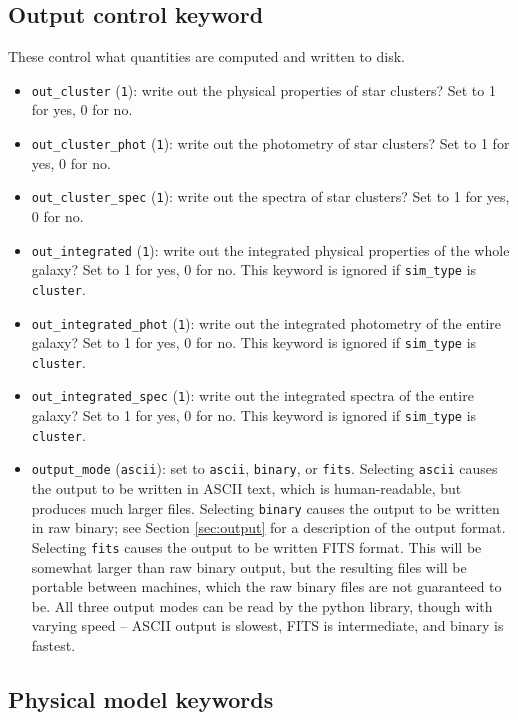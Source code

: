 \documentclass[12pt]{article}
\begin{document}
\subsection{Output control keyword}

These control what quantities are computed and written to disk.
\begin{itemize}
\item \verb=out_cluster= (\verb=1=): write out the physical properties of star clusters? Set to 1 for yes, 0 for no.
\item \verb=out_cluster_phot= (\verb=1=): write out the photometry of star clusters? Set to 1 for yes, 0 for no.
\item \verb=out_cluster_spec= (\verb=1=): write out the spectra of star clusters? Set to 1 for yes, 0 for no.
\item \verb=out_integrated= (\verb=1=): write out the integrated physical properties of the whole galaxy? Set to 1 for yes, 0 for no. This keyword is ignored if \verb=sim_type= is \verb=cluster=.
\item \verb=out_integrated_phot= (\verb=1=): write out the integrated photometry of the entire galaxy? Set to 1 for yes, 0 for no. This keyword is ignored if \verb=sim_type= is \verb=cluster=.
\item \verb=out_integrated_spec= (\verb=1=): write out the integrated spectra of the entire galaxy? Set to 1 for yes, 0 for no. This keyword is ignored if \verb=sim_type= is \verb=cluster=.
\item \verb=output_mode= (\verb=ascii=): set to \verb=ascii=, \verb=binary=, or \verb=fits=. Selecting \verb=ascii= causes the output to be written in ASCII text, which is human-readable, but produces much larger files. Selecting \verb=binary= causes the output to be written in raw binary; see Section \ref{sec:output} for a description of the output format. Selecting \verb=fits= causes the output to be written FITS format. This will be somewhat larger than raw binary output, but the resulting files will be portable between machines, which the raw binary files are not guaranteed to be. All three output modes can be read by the python library, though with varying speed -- ASCII output is slowest, FITS is intermediate, and binary is fastest.
\end{itemize}

\subsection{Physical model keywords}
\label{ssec:phys_keywords}
\end{document}
